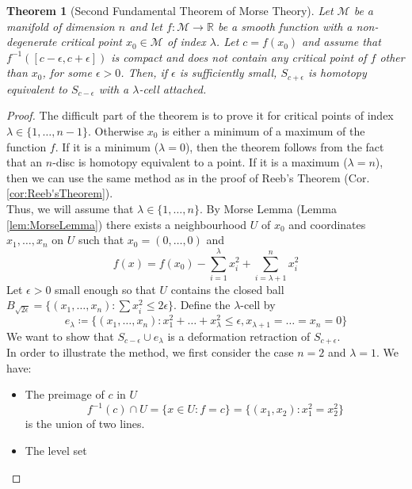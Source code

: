 \documentclass[10pt]{article}
\theoremstyle{plain}
\newtheorem{thm}{Theorem}[section] %
\theoremstyle{definition}
\newcommand{\Real}{\mathbb{R}}
\newcommand{\man}{\mathcal{M}}
\newcommand{\sumfromto}[2]{\sum\limits_{#1}^{#2}}
\newcommand{\mysection}[1]{
    \setcounter{thm}{0}
    \section*{#1}
    \addcontentsline{toc}{section}{#1}
    \addtocounter{section}{1}
    \setcounter{subsection}{0}

}
\newcommand{\finv}{f^{-1}}
\newcommand{\xcoords}{x_1,\ldots,x_n}
\begin{document}
\begin{thm}[Second Fundamental Theorem of Morse Theory]\label{thm:SecondFundamentalTheoremOfMorseTheory}
    Let $\man$ be a manifold of dimension $n$ and let $f:\man \to \Real$ be a smooth function with a non-degenerate critical point $x_0 \in \man$ of index $\lambda$. Let $c = f(x_0)$ and assume that $\finv ([c-\epsilon,c+\epsilon])$ is compact and does not contain any critical point of $f$ other than $x_0$, for some $\epsilon > 0$. Then, if $\epsilon$ is sufficiently small, $S_{c+\epsilon}$ is homotopy equivalent to $S_{c-\epsilon}$ with a $\lambda$-cell attached.
\end{thm}

\begin{proof}
    The difficult part of the theorem is to prove it for critical points of index $\lambda \in \{1,\ldots,n-1\}$. Otherwise $x_0$ is either a minimum of a maximum of the function $f$. If it is a minimum ($\lambda = 0$), then the theorem follows from the fact that an $n$-disc is homotopy equivalent to a point. If it is a maximum ($\lambda = n$), then we can use the same method as in the proof of Reeb's Theorem (Cor. \ref{cor:Reeb'sTheorem}). \\
    Thus, we will assume that $\lambda \in \{1,\ldots,n\}$. By Morse Lemma (Lemma \ref{lem:MorseLemma}) there exists a neighbourhood $U$ of $x_0$ and coordinates $x_1, \ldots,x_n$ on $U$ such that $x_0 = (0,\ldots,0)$ and \begin{equation}\label{eqn:MorseLemmaExpansion}
        f(x) = f(x_0) - \sumfromto{i=1}{\lambda} x_i^2 + \sumfromto{i= \lambda + 1}{n} x_i^2
    \end{equation}
    Let $\epsilon >0 $ small enough so that $U$ contains the closed ball $B_{\sqrt{2\epsilon}} = \{(x_1,\ldots,x_n): \sum x_i^2 \leq 2\epsilon\}$. Define the $\lambda$-cell by 
        $$e_\lambda \coloneqq \{(\xcoords) : x_1^2 + \dots + x_\lambda^2 \leq \epsilon , x_{\lambda +1} = \dots = x_n = 0\}$$
    We want to show that $S_{c-\epsilon} \cup e_\lambda$ is a deformation retraction of $S_{c+\epsilon}$.\\
    In order to illustrate the method, we first consider the case $n=2$ and $\lambda  =1$. We have:
        \begin{itemize}
            \item The preimage of $c$ in $U$
                        $$\finv(c) \cap U = \{x\in U:f = c\} = \{(x_1,x_2):x_1^2 = x_2^2\}$$
                is the union of two lines.
            \item The level set 

\end{itemize}
\end{proof}
\end{document}
